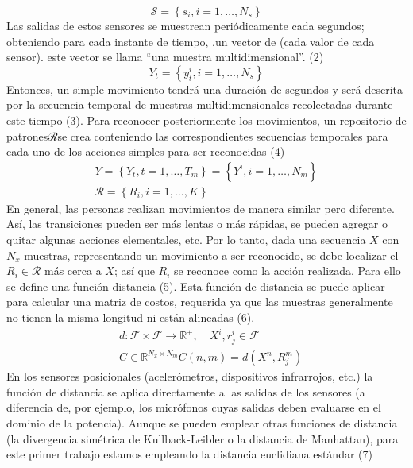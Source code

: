 \documentclass[10pt]{article}
\begin{document}
$$
\mathcal{S}=\left\{s_{i}, i=1, \ldots, N_{s}\right\}
$$
Las salidas de estos sensores se muestrean periódicamente cada    segundos; obteniendo para cada instante de tiempo,  ,un vector de    (cada valor de cada sensor). este vector    se llama “una muestra multidimensional”. (2) 
$$
Y_{t}=\left\{y_{t}^{i}, i=1, \ldots, N_{s}\right\}
$$
Entonces, un simple movimiento  tendrá una duración de    segundos y será descrita por la secuencia temporal de    muestras multidimensionales recolectadas durante este tiempo (3). Para reconocer posteriormente los movimientos, un repositorio de patronesℛse crea conteniendo las correspondientes secuencias temporales para cada uno de los  acciones simples para ser reconocidas (4)
$$
\begin{gathered}
Y=\left\{Y_{t}, t=1, \ldots, T_{m}\right\}=\left\{Y^{i}, i=1, \ldots, N_{m}\right\} \\
\mathcal{R}=\left\{R_{i}, i=1, \ldots, K\right\}
\end{gathered}
$$
En general, las personas realizan movimientos de manera similar pero diferente. Así, las transiciones pueden ser más lentas o más rápidas, se pueden agregar o quitar algunas acciones elementales, etc.  Por lo tanto, dada una secuencia $X$ con $N_{x}$ muestras, representando un movimiento a ser reconocido, se debe localizar el $R_{i} \in \mathcal{R}$ más cerca a $X$; así que $R_{i}$ se reconoce como la acción realizada. Para ello se define una función distancia (5). Esta función de distancia se puede aplicar para calcular una matriz de costos, requerida ya que las muestras generalmente no tienen la misma longitud ni están alineadas (6).
$$
\begin{aligned}
&d: \mathcal{F} \times \mathcal{F} \rightarrow \mathbb{R}^{+}, \quad X^{i}, r_{j}^{i} \in \mathcal{F} \\
&C \in \mathbb{R}^{N_{x} \times N_{m}} C(n, m)=d\left(X^{n}, R_{j}^{m}\right)
\end{aligned}
$$
En los sensores posicionales (acelerómetros, dispositivos infrarrojos, etc.) la función de distancia se aplica directamente a las salidas de los sensores (a diferencia de, por ejemplo, los micrófonos cuyas salidas deben evaluarse en el dominio de la potencia). Aunque se pueden emplear otras funciones de distancia (la divergencia simétrica de Kullback-Leibler o la distancia de Manhattan), para este primer trabajo estamos empleando la distancia euclidiana estándar (7)
\end{document}

